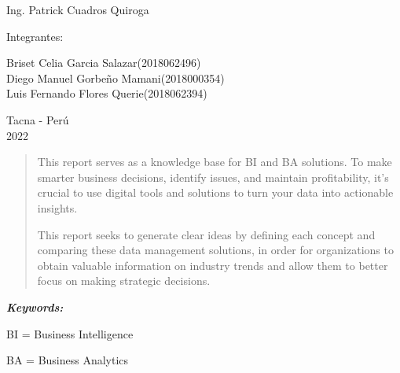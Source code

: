 \documentclass{article}
\providecommand{\keywords}[1]{
  \small	
  \textbf{\textit{\quad \quad Keywords: }} #1}
\begin{document}
\begin{titlepage}
\begin{center}
\vspace*{0.1in}
\begin{large}
 Ing. Patrick Cuadros Quiroga\\
\end{large}

\vspace*{0.2in}
\vspace*{0.1in}
\begin{large}

Integrantes: \\
\begin{flushleft}
Briset Celia Garcia Salazar\hfill(2018062496) \\
Diego Manuel Gorbeño Mamani\hfill(2018000354)\\
Luis Fernando Flores Querie\hfill(2018062394)\\

\end{flushleft}
\end{large}

\vspace*{0.1in}
\begin{large}
Tacna - Perú\\
2022
\end{large}
\end{center}
\end{titlepage}

\vspace*{\fill}
	
\begin{center}
    
\begin{abstract}
This report serves as a knowledge base for BI and BA solutions. To make smarter business decisions, identify issues, and maintain profitability, it's crucial to use digital tools and solutions to turn your data into actionable insights.

This report seeks to generate clear ideas by defining each concept and comparing these data management solutions, in order for organizations to obtain valuable information on industry trends and allow them to better focus on making strategic decisions.
\quad 

 \end{abstract}
 
 
 \keywords{}
 
 BI = Business Intelligence
 
BA = Business Analytics
\end{center}
\vspace*{\fill}
\end{document}
